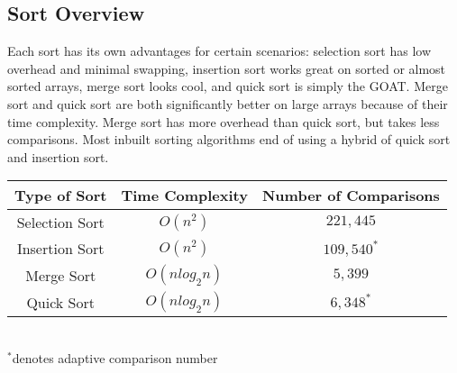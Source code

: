 \documentclass[letterpaper, 10pt]{article}
\begin{document}
\subsection{Sort Overview}
Each sort has its own advantages for certain scenarios: selection sort has low overhead and minimal
swapping, insertion sort works great on sorted or almost sorted arrays, merge sort looks cool, and 
quick sort is simply the GOAT. Merge sort and quick sort are both significantly better on large arrays
because of their time complexity. Merge sort has more overhead than quick sort, but takes less comparisons. 
Most inbuilt sorting algorithms end of using a hybrid of quick sort and insertion sort.
\begin{center}
\begin{tabular}{||c c c||} 
 \hline
 Type of Sort & Time Complexity & Number of Comparisons \\ [0.5ex] 
 \hline\hline
 Selection Sort & \( O(n^2)\) & \(221,445\) \\
 \hline
 Insertion Sort & \( O(n^2)\) & \(109,540^*\) \\
 \hline
 Merge Sort & \( O(nlog_2n)\) & \(5,399\) \\
 \hline
 Quick Sort & \( O(nlog_2n)\) & \(6,348^*\) \\
 \hline
\end{tabular}
\\
\(^*\)denotes adaptive comparison number
\end{center}





\vspace{2em}

\end{document}
